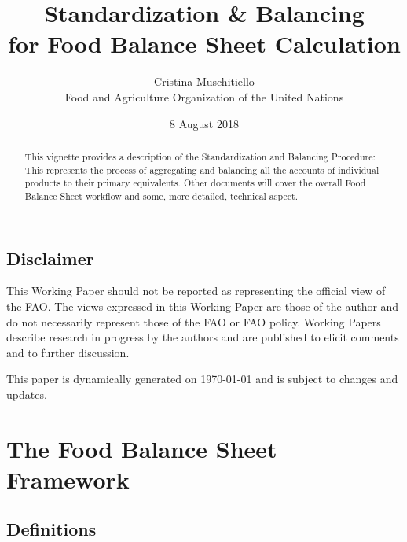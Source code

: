 \documentclass[]{article}
\title{Standardization \& Balancing\\
for Food Balance Sheet Calculation}
\author{Cristina Muschitiello\\
Food and Agriculture Organization of the United Nations}
\date{8 August 2018}
\begin{document}
\maketitle
\begin{abstract}
This vignette provides a description of the Standardization and
Balancing Procedure: This represents the process of aggregating and
balancing all the accounts of individual products to their primary
equivalents. Other documents will cover the overall Food Balance Sheet
workflow and some, more detailed, technical aspect.
\end{abstract}

{
\setcounter{tocdepth}{4}
\tableofcontents
}
\newpage

\listoftables

\listoffigures

\newpage

\subsection*{Disclaimer}\label{disclaimer}

This Working Paper should not be reported as representing the official
view of the FAO. The views expressed in this Working Paper are those of
the author and do not necessarily represent those of the FAO or FAO
policy. Working Papers describe research in progress by the authors and
are published to elicit comments and to further discussion.

This paper is dynamically generated on \today{} and is subject to
changes and updates.

\section*{The Food Balance Sheet
Framework}\label{the-food-balance-sheet-framework}

\subsection*{Definitions}\label{definitions}
\end{document}
